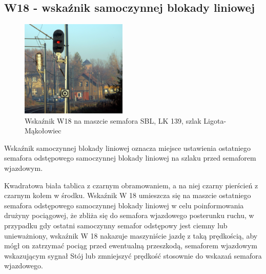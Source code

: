 \subsection{W18 - wskaźnik samoczynnej blokady liniowej}

	\begin{figure}
	\includegraphics[width=0.45\textwidth]{skryptkierownik-img/skryptkierownik-img017.jpg}
	\caption{Wskaźnik W18 na maszcie semafora SBL, LK 139, szlak Ligota- Mąkołowiec}
\end{figure}
\begin{tcolorbox}[colback=black!5!white,colframe=white!55!black,title=Wskaźnik W18] {\textquotedbl}Wskaźnik samoczynnej blokady liniowej{\textquotedbl} oznacza miejsce ustawienia ostatniego semafora odstępowego samoczynnej blokady liniowej na szlaku przed semaforem wjazdowym. 
\end{tcolorbox}
Kwadratowa biała tablica z czarnym obramowaniem, a na niej czarny pierścień z czarnym kołem w środku. Wskaźnik W 18 umieszcza się na maszcie ostatniego semafora odstępowego samoczynnej blokady liniowej w celu poinformowania drużyny pociągowej, że zbliża się do semafora wjazdowego posterunku ruchu, w przypadku gdy ostatni samoczynny semafor odstępowy jest ciemny lub
unieważniony, wskaźnik W 18 nakazuje maszyniście jazdę z taką prędkością, aby mógł on zatrzymać pociąg przed ewentualną przeszkodą, semaforem wjazdowym wskazującym sygnał {\textquotedbl}Stój{\textquotedbl} lub zmniejszyć prędkość stosownie do wskazań semafora wjazdowego.

